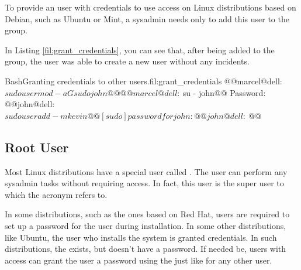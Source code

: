 
To provide an user with credentials to use  access on Linux distributions based on Debian, such as Ubuntu or Mint, a sysadmin needs only to add this user to the  group.

In Listing \ref{fil:grant_credentials}, you can see that, after being added to the  group, the user  was able to create a new user without any incidents.

\begin{command_line_float}{Bash}{Granting  credentials to other users.}{fil:grant_credentials}
@@marcel@dell:~$sudo usermod -aG sudo john@@
@@marcel@dell:~$su - john@@
Password:
@@john@dell:~$sudo useradd -m kevin@@
[sudo] password for john: 
@@john@dell:~$@@
\end{command_line_float}

\subsection{Root User}
Most Linux distributions have a special user called . The  user can perform any sysadmin tasks without requiring  access. In fact, this user is the super user to which the  acronym refers to.

In some distributions, such as the ones based on Red Hat, users are required to set up a password for the  user during installation. In some other distributions, like Ubuntu, the user who installs the system is granted  credentials. In such distributions, the  exists, but doesn't have a password. If needed be, users with  access can grant the  user a password using the  just like for any other user.

